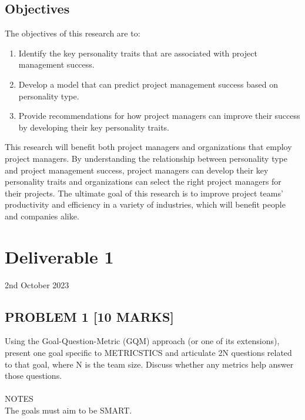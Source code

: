 \subsection{Objectives}
The objectives of this research are to:
\begin{enumerate}
    \item Identify the key personality traits that are associated with project management success.
    \item Develop a model that can predict project management success based on personality type.
    \item Provide recommendations for how project managers can improve their success by developing their key personality traits.
\end{enumerate}
This research will benefit both project managers and organizations that employ project managers. By understanding the relationship between personality type and project management success, project managers can develop their key personality traits and organizations can select the right project managers for their projects. The ultimate goal of this research is to improve project teams' productivity and efficiency in a variety of industries, which will benefit people and companies alike.




















\section* {Deliverable 1}
2nd October 2023

    \subsection*{PROBLEM 1 [10 MARKS]}

    Using the Goal-Question-Metric (GQM) approach (or one of its extensions), present one goal specific to METRICSTICS and articulate 2N questions related to that goal, where N is the team size. Discuss whether any metrics help answer those questions. 
    \\\\
    NOTES
    \\
    The goals must aim to be SMART.

